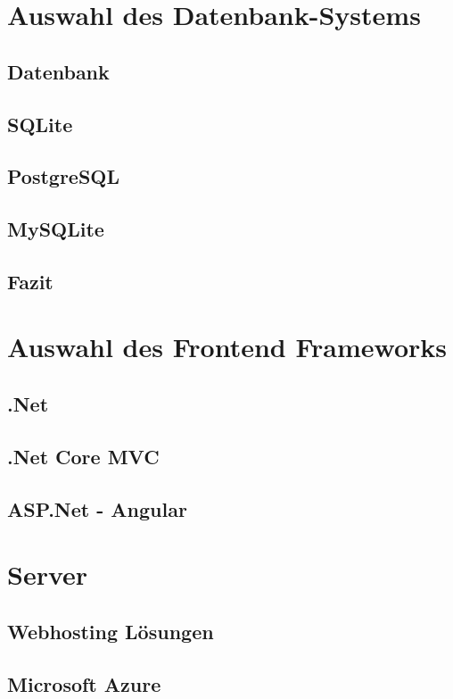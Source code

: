 \section{Auswahl des Datenbank-Systems}
    
    \subsection{Datenbank}
        
    \subsection{SQLite}
        
    \subsection{PostgreSQL}
        \lipsum[5-12]
    \subsection{MySQLite}
        \lipsum[5-12]
    \subsection{Fazit}
    \lipsum[5-12]
\section{Auswahl des Frontend Frameworks}
    \lipsum[5-12]
    \subsection{.Net}
        \lipsum[5-12]
    \subsection{.Net Core MVC}
        \lipsum[5-12]
    \subsection{ASP.Net - Angular}
        \lipsum[5-12]
\section{Server}
    \lipsum[5-12]
    \subsection{Webhosting Lösungen}
        \lipsum[5-12]
    \subsection{Microsoft Azure}
        \lipsum[5-12]
